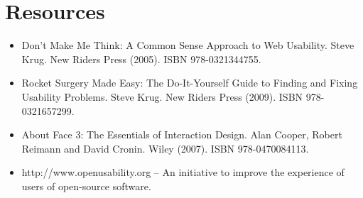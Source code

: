 \section*{Resources}
\begin{itemize}
 \item  Don't Make Me Think: A Common Sense Approach to Web Usability. Steve Krug. New Riders Press (2005). ISBN 978-0321344755.
 \item Rocket Surgery Made Easy: The Do-It-Yourself Guide to Finding and Fixing Usability Problems. Steve Krug. New Riders Press (2009). ISBN 978-0321657299.
 \item About Face 3: The Essentials of Interaction Design. Alan Cooper, Robert Reimann and David Cronin. Wiley (2007). ISBN 978-0470084113.
 \item http://www.openusability.org – An initiative to improve the experience of users of open-source software.
\end{itemize}
